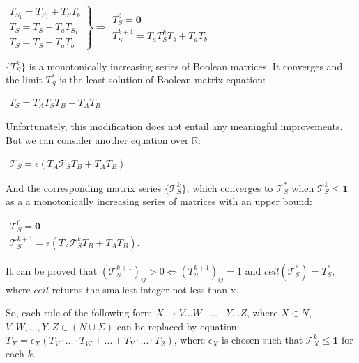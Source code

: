\documentclass[sigconf]{acmart}
\begin{document}
\begin{center}
\(
\left. 
\begin{array}{l}
T_{S_1} = T_{S_1} + T_ST_b \\
T_S = T_S + T_aT_{S_1} \\ 
T_S = T_S + T_aT_b
\end{array} 
\right\}
\Rightarrow 
\left. 
\begin{array}{l}
T_S^0 = \mathbf{0} \\
T_S^{k+1} = T_a T_S^k T_b + T_a T_b
\end{array} 
\right.
\)
\end{center}

$\{ T_S^k\}$ is a monotonically increasing series of Boolean matrices. 
It converges and the limit $T_S^*$ is the least solution of Boolean matrix equation:

\begin{center}
\(
\left. 
\begin{array}{l}
T_S = T_AT_ST_B + T_AT_B
\end{array} 
\right.
\)
\end{center}

Unfortunately, this modification does not entail any meaningful improvements. 
But we can consider another equation over $\mathbb{R}$:

\begin{center}
\(
\left. 
\begin{array}{l}
\mathcal{T}_S = \epsilon(T_A \mathcal{T}_S T_B + T_A T_B)
\end{array}
\right.
\)
\end{center}

And the corresponding matrix series $\{ \mathcal{T}_S^{k}\}$, which converges to $\mathcal{T}_S^*$ when $\mathcal{T}_S^{k} \leq \textbf{1}$ as a a monotonically increasing series of matrices with an upper bound:

\begin{center}
\(
\left.
\begin{array}{c}
\mathcal{T}_S^0 = \mathbf{0} \\
\mathcal{T}_S^{k+1} = \epsilon(T_A \mathcal{T}_S^k T_B + T_A T_B).
\end{array} 
\right.
\)
\end{center}

It can be proved that $(\mathcal{T}_S^{k+1})_{ij} > 0 \iff (T_S^{k+1})_{ij} = 1$ and $ceil(\mathcal{T}_S^*) = T_S^*$, where $ceil$ returns the smallest integer not less than x.

So, each rule of the following form $X \rightarrow V \ldots W \mid \dots \mid Y \ldots Z$, where $X \in N$, $V, W, \ldots , Y, Z \in (N \cup \Sigma)$ can be replaced by equation:
$T_X = \epsilon_X (T_V \cdot \ldots \cdot T_W + \dots + T_Y \cdot \ldots \cdot T_Z)$, where $\epsilon_X$ is chosen such that $\mathcal{T}_X^{k} \leq \textbf{1}$ for each $k$.
\end{document}
